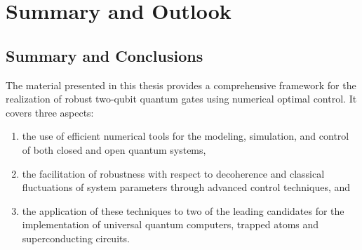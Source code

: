 \chapter{Summary and Outlook}
\label{chap:outlook}

\section{Summary and Conclusions}

The material presented in this thesis provides a comprehensive framework for the
realization of robust two-qubit quantum gates using numerical optimal control.
It covers three aspects:
\begin{enumerate}[noitemsep]
  \item the use of efficient numerical tools for the modeling, simulation, and
        control of both closed and open quantum systems,
  \item the facilitation of robustness with respect to decoherence and classical
        fluctuations of system parameters through advanced control techniques,
        and
  \item the application of these techniques to two of the leading candidates for
        the implementation of universal quantum computers, trapped atoms and
        superconducting circuits.
\end{enumerate}

